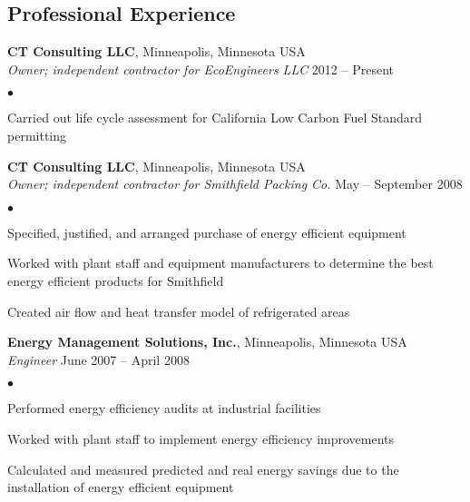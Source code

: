 \documentclass[margin,line]{res}
\newenvironment{list2}{
  \begin{list}{$\bullet$}{%
      \setlength{\itemsep}{0in}
      \setlength{\parsep}{0in} \setlength{\parskip}{0in}
      \setlength{\topsep}{0in} \setlength{\partopsep}{0in} 
      \setlength{\leftmargin}{0.2in}}}{\end{list}}
\begin{document}
\begin{resume}

\section{\sc Professional Experience}

{\bf CT Consulting LLC}, Minneapolis, Minnesota USA\\
\vspace{-.3cm}
{\em Owner; independent contractor for EcoEngineers LLC} \hfill 2012 -- Present\\
\begin{list2}
\item Carried out life cycle assessment for California Low Carbon Fuel Standard permitting
\end{list2}

\vspace*{-.1in}

{\bf CT Consulting LLC}, Minneapolis, Minnesota USA\\
\vspace{-.3cm}
{\em Owner; independent contractor for Smithfield Packing Co.} \hfill May -- September 2008\\
\begin{list2}
\item Specified, justified, and arranged purchase of energy efficient equipment
\item Worked with plant staff and equipment manufacturers to determine the best energy efficient  products for Smithfield
\item Created air flow and heat transfer model of refrigerated areas
\end{list2}

\vspace*{-.1in}

{\bf Energy Management Solutions, Inc.}, Minneapolis, Minnesota USA\\
\vspace{-.3cm}
{\em Engineer} \hfill June 2007 -- April 2008\\
\begin{list2}
\item Performed energy efficiency audits at industrial facilities
\item Worked with plant staff to implement energy efficiency improvements
\item Calculated and measured predicted and real energy savings due to the installation of energy efficient equipment
\end{list2}


\end{resume}
\end{document}
